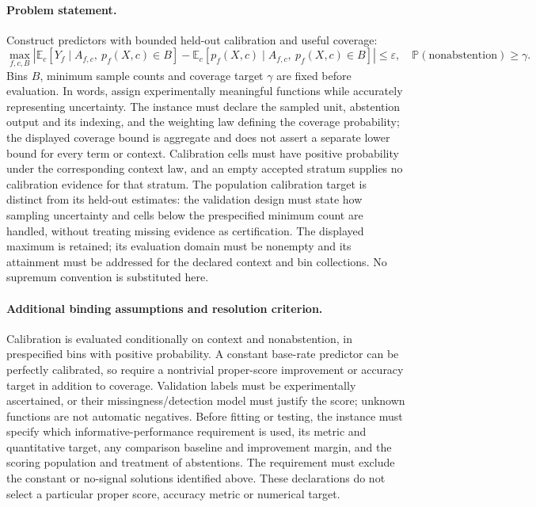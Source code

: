 \documentclass[11pt]{article}
\begin{document}
\paragraph{Problem statement.} Construct predictors with bounded held-out calibration and useful coverage:
\[
\max_{f,c,B}\left|\mathbb{E}_c[Y_f\mid A_{f,c},\ p_f(X,c)\in B]-\mathbb{E}_c[p_f(X,c)\mid A_{f,c},\ p_f(X,c)\in B]\right|\leq\varepsilon,
\quad \mathbb{P}(\mathrm{nonabstention})\geq\gamma.
\]
Bins $B$, minimum sample counts and coverage target $\gamma$ are fixed before evaluation. In words, assign experimentally meaningful functions while accurately representing uncertainty. The instance must declare the sampled unit, abstention output and its indexing, and the weighting law defining the coverage probability; the displayed coverage bound is aggregate and does not assert a separate lower bound for every term or context. Calibration cells must have positive probability under the corresponding context law, and an empty accepted stratum supplies no calibration evidence for that stratum. The population calibration target is distinct from its held-out estimates: the validation design must state how sampling uncertainty and cells below the prespecified minimum count are handled, without treating missing evidence as certification. The displayed maximum is retained; its evaluation domain must be nonempty and its attainment must be addressed for the declared context and bin collections. No supremum convention is substituted here.
\paragraph{Additional binding assumptions and resolution criterion.} Calibration is evaluated conditionally on context and nonabstention, in prespecified bins with positive probability. A constant base-rate predictor can be perfectly calibrated, so require a nontrivial proper-score improvement or accuracy target in addition to coverage. Validation labels must be experimentally ascertained, or their missingness/detection model must justify the score; unknown functions are not automatic negatives. Before fitting or testing, the instance must specify which informative-performance requirement is used, its metric and quantitative target, any comparison baseline and improvement margin, and the scoring population and treatment of abstentions. The requirement must exclude the constant or no-signal solutions identified above. These declarations do not select a particular proper score, accuracy metric or numerical target.
\end{document}
